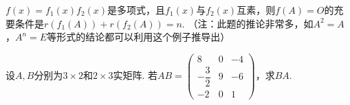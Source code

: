 \begin{exercise}
\begin{exgroup}
        \item $f(x)=f_1(x)f_2(x)$是多项式，且$f_1(x)$与$f_2(x)$互素，则$f(A)=O$的充要条件是$r(f_1(A))+r(f_2(A))=n$. （注：此题的推论非常多，如$A^2=A$，$A^n=E$等形式的结论都可以利用这个例子推导出）

        \item 设$A,B$分别为$3 \times 2$和$2 \times 3$实矩阵. 若$AB=\begin{pmatrix}
                8             & 0 & -4 \\[1ex]
                -\dfrac{3}{2} & 9 & -6 \\[1ex]
                -2            & 0 & 1
            \end{pmatrix}$，求$BA$.
    \end{exgroup}
\end{exercise}

